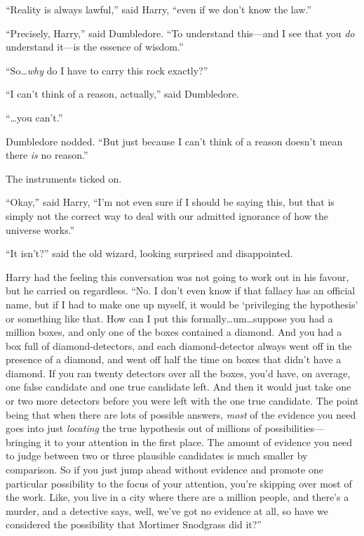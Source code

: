 “Reality is always lawful,” said Harry, “even if we don’t know the law.”

“Precisely, Harry,” said Dumbledore. “To understand this—and I see that you \emph{do} understand it—is the essence of wisdom.”

“So…\emph{why} do I have to carry this rock exactly?”

“I can’t think of a reason, actually,” said Dumbledore.

“…you can’t.”

Dumbledore nodded. “But just because I can’t think of a reason doesn’t mean there \emph{is} no reason.”

The instruments ticked on.

“Okay,” said Harry, “I’m not even sure if I should be saying this, but that is simply not the correct way to deal with our admitted ignorance of how the universe works.”

“It isn’t?” said the old wizard, looking surprised and disappointed.

Harry had the feeling this conversation was not going to work out in his favour, but he carried on regardless. “No. I don’t even know if that fallacy has an official name, but if I had to make one up myself, it would be ‘privileging the hypothesis’ or something like that. How can I put this formally…um…suppose you had a million boxes, and only one of the boxes contained a diamond. And you had a box full of diamond-detectors, and each diamond-detector always went off in the presence of a diamond, and went off half the time on boxes that didn’t have a diamond. If you ran twenty detectors over all the boxes, you’d have, on average, one false candidate and one true candidate left. And then it would just take one or two more detectors before you were left with the one true candidate. The point being that when there are lots of possible answers, \emph{most} of the evidence you need goes into just \emph{locating} the true hypothesis out of millions of possibilities—bringing it to your attention in the first place. The amount of evidence you need to judge between two or three plausible candidates is much smaller by comparison. So if you just jump ahead without evidence and promote one particular possibility to the focus of your attention, you’re skipping over most of the work. Like, you live in a city where there are a million people, and there’s a murder, and a detective says, well, we’ve got no evidence at all, so have we considered the possibility that Mortimer Snodgrass did it?”

